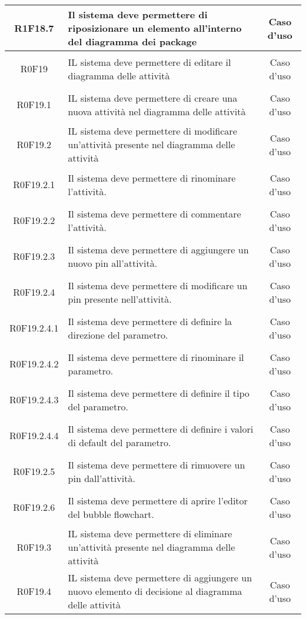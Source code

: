 \documentclass[../AnalisiDeiRequisiti.tex]{subfiles}
\begin{document}
\begin{longtable}{|c|>{\centering}p{7cm}|c|}
\hypertarget{R1F18.7}{R1F18.7} & Il sistema deve permettere di riposizionare un elemento all'interno del diagramma dei package & Caso d'uso \\ \hline
\hypertarget{R0F19}{R0F19} & IL sistema deve permettere di editare il diagramma delle attività & Caso d'uso \\ \hline
\hypertarget{R0F19.1}{R0F19.1} & IL sistema deve permettere di creare una nuova attività nel diagramma delle attività & Caso d'uso \\ \hline
\hypertarget{R0F19.2}{R0F19.2} & IL sistema deve permettere di modificare un'attività presente nel diagramma delle attività & Caso d'uso \\ \hline
\hypertarget{R0F19.2.1}{R0F19.2.1} & Il sistema deve permettere di rinominare l'attività. & Caso d'uso \\ \hline
\hypertarget{R0F19.2.2}{R0F19.2.2} & Il sistema deve permettere di commentare l'attività. & Caso d'uso \\ \hline
\hypertarget{R0F19.2.3}{R0F19.2.3} & Il sistema deve permettere di aggiungere un nuovo pin all'attività. & Caso d'uso \\ \hline
\hypertarget{R0F19.2.4}{R0F19.2.4} & Il sistema deve permettere di modificare un pin presente nell'attività. & Caso d'uso \\ \hline
\hypertarget{R0F19.2.4.1}{R0F19.2.4.1} & Il sistema deve permettere di definire la direzione del parametro. & Caso d'uso \\ \hline
\hypertarget{R0F19.2.4.2}{R0F19.2.4.2} & Il sistema deve permettere di rinominare il parametro. & Caso d'uso \\ \hline
\hypertarget{R0F19.2.4.3}{R0F19.2.4.3} & Il sistema deve permettere di definire il tipo del parametro. & Caso d'uso \\ \hline
\hypertarget{R0F19.2.4.4}{R0F19.2.4.4} & Il sistema deve permettere di definire i valori di default del parametro. & Caso d'uso \\ \hline
\hypertarget{R0F19.2.5}{R0F19.2.5} & Il sistema deve permettere di rimuovere un pin dall'attività. & Caso d'uso \\ \hline
\hypertarget{R0F19.2.6}{R0F19.2.6} & Il sistema deve permettere di aprire l'editor del bubble flowchart. & Caso d'uso \\ \hline
\hypertarget{R0F19.3}{R0F19.3} & IL sistema deve permettere di eliminare un'attività presente nel diagramma delle attività & Caso d'uso \\ \hline
\hypertarget{R0F19.4}{R0F19.4} & IL sistema deve permettere di aggiungere un nuovo elemento di decisione al diagramma delle attività & Caso d'uso \\ \hline

\end{longtable}
\end{document}
